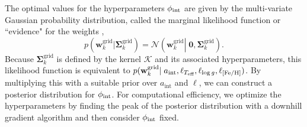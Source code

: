\documentclass[iop,floatfix,numberedappendix,twocolappendix]{emulateapj}
\newcommand{\Z}{[{\rm Fe}/{\rm H}]}
\begin{document}
The optimal values for the hyperparameters $\phi_{\rm int}$ are given by the multi-variate Gaussian 
probability distribution, called the marginal likelihood function or ``evidence" for the weights 
\citep{rasmussen05},
\begin{equation}
  p(\mathbf{w}_k^\textrm{grid} | \mathbf{\Sigma}_k^\textrm{grid} ) = \mathcal{N}\left (\mathbf{w}_k^\textrm{grid} \left | \; \mathbf{0}, \mathbf{\Sigma}_k^\textrm{grid} \right . \right ).
\end{equation}
Because $\mathbf{\Sigma}_k^\textrm{grid}$ is defined by the kernel $\mathcal{K}$ and its associated 
hyperparameters, this likelihood function is equivalent to $p(\mathbf{w}_k^\textrm{grid} |\; 
a_\textrm{int}, \ell_{T_\textrm{eff}},  \ell_{\log g}, \ell_{\Z})$.  By multiplying this with a 
suitable prior over $a_\textrm{int}$ and $\ell$, we can construct a posterior distribution for 
$\phi_{\rm int}$.  For computational efficiency, we optimize the hyperparameters by finding the 
peak of the posterior distribution with a downhill gradient algorithm and then consider 
$\phi_{\rm int}$ fixed.
\end{document}
